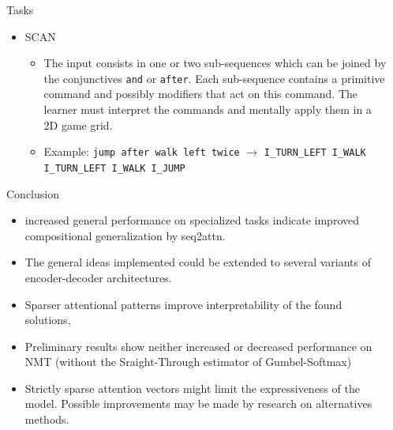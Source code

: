 \documentclass[final,hyperref={pdfpagelabels=false}]{beamer}
\begin{document}
\begin{frame}[t]
\begin{columns}[t]
\begin{column}{.465\textwidth}
\begin{block}{Tasks}
\begin{itemize}
		\item SCAN
		\begin{itemize}
			\item The input consists in one or two sub-sequences which can be joined by the conjunctives \texttt{and} or \texttt{after}. Each sub-sequence contains a primitive command and possibly modifiers that act on this command. The learner must interpret the commands and mentally apply them in a 2D game grid.
			\item Example: \texttt{jump after walk left twice} $\rightarrow$ \texttt{I\_TURN\_LEFT I\_WALK I\_TURN\_LEFT I\_WALK I\_JUMP}
		\end{itemize}
		
	\end{itemize}
	
\end{block}



\begin{block}{Conclusion}

\begin{itemize}
	\item increased general performance on specialized tasks indicate improved compositional generalization by seq2attn.
	\item The general ideas implemented could be extended to several variants of encoder-decoder architectures.
	\item Sparser attentional patterns improve interpretability of the found solutions,
	\item Preliminary results show neither increased or decreased performance on NMT (without the Sraight-Through estimator of Gumbel-Softmax)
	\item Strictly sparse attention vectors might limit the expressiveness of the model. Possible improvements may be made by research on alternatives methods.
\end{itemize}

\end{block}

\end{column} %

\begin{column}{.015\textwidth}\end{column} %

\end{columns} %

\end{frame} %
\end{document}
